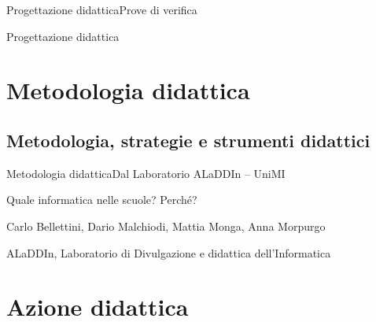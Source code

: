 \documentclass[italian]{beamer}
\begin{document}
\begin{frame}{Progettazione didattica}{Prove di verifica}
\end{frame}

\begin{frame}{Progettazione didattica}{}
	\centering{}
\end{frame}

\section[Metodologia didattica]{Metodologia didattica}

\subsection[Strategie\ldots]{Metodologia, strategie e strumenti didattici}

\begin{frame}{Metodologia didattica}{Dal Laboratorio ALaDDIn -- UniMI}
	\begin{center}{\Large Quale informatica nelle scuole? Perch\'e?}\end{center}
	
	\medskip

	\begin{center}Carlo Bellettini, Dario Malchiodi, Mattia Monga, Anna Morpurgo\end{center}
	
	\medskip

	\begin{center}ALaDDIn, Laboratorio di Divulgazione e didattica dell'Informatica\end{center}
\end{frame}


{

}
{

}
{

}
{

}

\section[Azione didattica]{Azione didattica}
\end{document}
